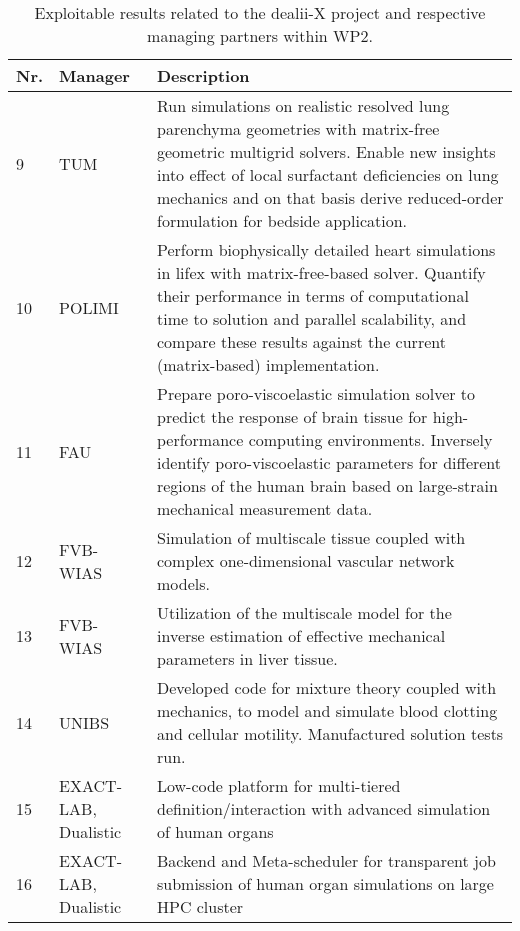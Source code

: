 \documentclass[a4paper,12pt]{article}
\begin{document}
\begin{center}
    \small
    \renewcommand{\arraystretch}{1.25}
    \begin{longtable}{|l|p{2.5cm}|p{12cm}|}
    \caption{Exploitable results related to the dealii-X project and respective managing partners within WP2.}
    \label{tab:exploitable_results_WP2}
    \\
    \hline
    \textbf{Nr.} & \textbf{Manager} & \textbf{Description} \\
    \hline
    9 & TUM &
    Run simulations on realistic resolved lung parenchyma geometries with matrix-free geometric multigrid solvers. Enable new insights into effect of local surfactant deficiencies on lung mechanics and on that basis derive reduced-order formulation for bedside application.
    \\
    \hline
    10 & POLIMI &
    Perform biophysically detailed heart simulations in lifex with matrix-free-based solver. Quantify their performance in terms of computational time to solution and parallel scalability, and compare these results against the current (matrix-based) implementation.
    \\
    \hline
    11 & FAU &
    Prepare poro-viscoelastic simulation solver to predict the response of brain tissue for high-performance computing environments. Inversely identify poro-viscoelastic parameters for different regions of the human brain based on large-strain mechanical measurement data.
    \\
    \hline
    12 & FVB-WIAS &
    Simulation of multiscale tissue coupled with complex one-dimensional vascular network models.
    \\
    \hline
    13 & FVB-WIAS &
    Utilization of the multiscale model for the inverse estimation of effective mechanical parameters in liver tissue. 
    \\
    \hline
    14 & UNIBS &
    Developed code for mixture theory coupled with mechanics, to model and simulate blood clotting and cellular motility. Manufactured solution tests run.
    \\
    \hline
    15 & EXACT-LAB, Dualistic &
    Low-code platform for multi-tiered definition/interaction with advanced simulation of human organs
    \\
    \hline
    16 & EXACT-LAB, Dualistic &
    Backend and Meta-scheduler for transparent job submission of human organ simulations on large HPC cluster 
    \\
    \hline
    \end{longtable}
\end{center}
\end{document}
